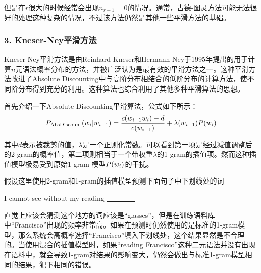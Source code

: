 \parinterval 但是在$r$很大的时候经常会出现$n_{r+1}=0$的情况。通常，古德-图灵方法可能无法很好的处理这种复杂的情况，不过该方法仍然是其他一些平滑方法的基础。


\subsubsection{3. Kneser-Ney平滑方法}

\parinterval Kneser-Ney平滑方法是由Reinhard Kneser和Hermann Ney于1995年提出的用于计算$n$元语法概率分布的方法，并被广泛认为是最有效的平滑方法之一。这种平滑方法改进了Absolute Discounting中与高阶分布相结合的低阶分布的计算方法，使不同阶分布得到充分的利用。这种算法也综合利用了其他多种平滑算法的思想。

\parinterval 首先介绍一下Absolute Discounting平滑算法，公式如下所示：
\begin{eqnarray}
{P}_{\textrm{AbsDiscount}}(w_i | w_{i-1}) = \frac{c(w_{i-1} w_i )-d}{c(w_{i-1})} + \lambda(w_{i-1}){P}(w_{i})
\label{eq:2-33}
\end{eqnarray}

\noindent 其中$d$表示被裁剪的值，$\lambda$是一个正则化常数。可以看到第一项是经过减值调整后的2-gram的概率值，第二项则相当于一个带权重$\lambda$的1-gram的插值项。然而这种插值模型极易受到原始1-gram 模型${P}(w_{i})$的干扰。

\parinterval 假设这里使用2-gram和1-gram的插值模型预测下面句子中下划线处的词

\vspace{0.0em}
\begin{center}
I cannot see without my reading \underline{\ \ \ \ \ \ \ \ }
\end{center}
\vspace{0.0em}

\noindent 直觉上应该会猜测这个地方的词应该是“glasses”，但是在训练语料库中“Francisco”出现的频率非常高。如果在预测时仍然使用的是标准的1-gram模型，那么系统会高概率选择“Francisco”填入下划线处，这个结果显然是不合理的。当使用混合的插值模型时，如果“reading Francisco”这种二元语法并没有出现在语料中，就会导致1-gram对结果的影响变大，仍然会做出与标准1-gram模型相同的结果，犯下相同的错误。

